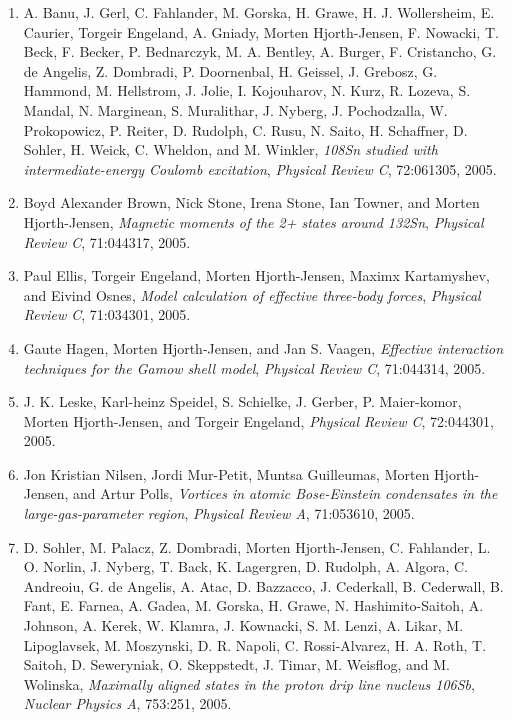 \documentclass[%
oneside,                 %
final,                   %
10pt]{article}
\begin{document}
\begin{enumerate}
\item A. Banu, J. Gerl, C. Fahlander, M. Gorska, H. Grawe, H. J. Wollersheim,   E. Caurier, Torgeir Engeland, A. Gniady, Morten Hjorth-Jensen, F. Nowacki,   T. Beck, F. Becker, P. Bednarczyk, M. A. Bentley, A. Burger, F. Cristancho,   G. de Angelis, Z. Dombradi, P. Doornenbal, H. Geissel, J. Grebosz,   G. Hammond, M. Hellstrom, J. Jolie, I. Kojouharov, N. Kurz, R. Lozeva,   S. Mandal, N. Marginean, S. Muralithar, J. Nyberg, J. Pochodzalla,   W. Prokopowicz, P. Reiter, D. Rudolph, C. Rusu, N. Saito, H. Schaffner,   D. Sohler, H. Weick, C. Wheldon, and M. Winkler,  \emph{108Sn studied with intermediate-energy Coulomb excitation},  \emph{Physical Review C}, 72:061305, 2005. 

\item Boyd Alexander Brown, Nick Stone, Irena Stone, Ian Towner, and Morten Hjorth-Jensen,  \emph{Magnetic moments of the 2+ states around 132Sn},  \emph{Physical Review C}, 71:044317, 2005. 

\item Paul Ellis, Torgeir Engeland, Morten Hjorth-Jensen, Maximx Kartamyshev, and   Eivind Osnes, \emph{Model calculation of effective three-body forces},   \emph{Physical Review C}, 71:034301, 2005. 

\item Gaute Hagen, Morten Hjorth-Jensen, and Jan S. Vaagen, \emph{Effective interaction techniques for the Gamow shell model},  \emph{Physical Review C}, 71:044314, 2005. 

\item J. K. Leske, Karl-heinz Speidel, S. Schielke, J. Gerber, P. Maier-komor, Morten   Hjorth-Jensen, and Torgeir Engeland,  \emph{Physical Review C}, 72:044301, 2005. 

\item Jon Kristian Nilsen, Jordi Mur-Petit, Muntsa Guilleumas, Morten Hjorth-Jensen,   and Artur Polls,  \emph{Vortices in atomic Bose-Einstein condensates in the  large-gas-parameter region},  \emph{Physical Review A}, 71:053610, 2005. 

\item D. Sohler, M. Palacz, Z. Dombradi, Morten Hjorth-Jensen, C. Fahlander, L. O.   Norlin, J. Nyberg, T. Back, K. Lagergren, D. Rudolph, A. Algora, C. Andreoiu,   G. de Angelis, A. Atac, D. Bazzacco, J. Cederkall, B. Cederwall, B. Fant,   E. Farnea, A. Gadea, M. Gorska, H. Grawe, N. Hashimito-Saitoh, A. Johnson,   A. Kerek, W. Klamra, J. Kownacki, S. M. Lenzi, A. Likar, M. Lipoglavsek,   M. Moszynski, D. R. Napoli, C. Rossi-Alvarez, H. A. Roth, T. Saitoh,   D. Seweryniak, O. Skeppstedt, J. Timar, M. Weisflog, and M. Wolinska, \emph{Maximally aligned states in the proton drip line nucleus 106Sb},  \emph{Nuclear Physics A}, 753:251, 2005. 


\end{enumerate}
\end{document}
